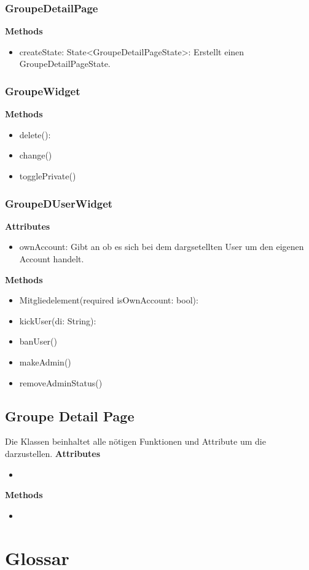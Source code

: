 \documentclass[parskip=full]{scrartcl}
\begin{document}
        \subsubsection{GroupeDetailPage}
            \textbf{Methods}
            \begin{itemize}
                \item createState: State<GroupeDetailPageState>: Erstellt einen GroupeDetailPageState.
            \end{itemize}

        \subsubsection{GroupeWidget}
            \textbf{Methods}
            \begin{itemize}
                \item delete(): 
                \item change()
                \item togglePrivate()
            \end{itemize}

        \subsubsection{GroupeDUserWidget}
            \textbf{Attributes}
            \begin{itemize}
                \item ownAccount: Gibt an ob es sich bei dem dargsetellten User um den eigenen Account handelt.
            \end{itemize}
            
            \textbf{Methods}
            \begin{itemize}
                \item  Mitgliedelement(required isOwnAccount: bool):
                \item  kickUser(di: String):
                \item  banUser()
                \item  makeAdmin()
                \item  removeAdminStatus()
            \end{itemize}
    
        \newpage
        
         \subsection{Groupe Detail Page}
            Die Klassen beinhaltet alle nötigen Funktionen und Attribute um die  darzustellen.\newline
        \textbf{Attributes}
        \begin{itemize}
            \item 
        \end{itemize}
        
        \textbf{Methods}
        \begin{itemize}
            \item 
        \end{itemize}
 
\newpage
\section{Glossar}
\printglossary[style=altlist]
\end{document}
